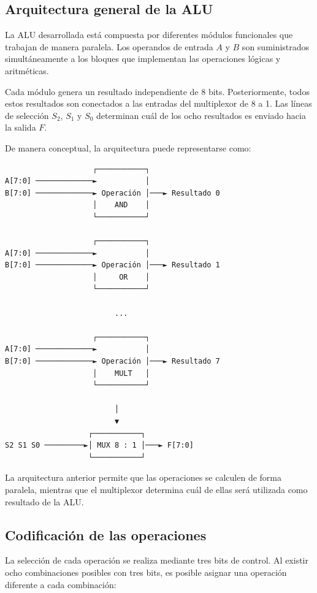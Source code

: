\documentclass[12pt,a4paper]{article}
\begin{document}
\subsection{Arquitectura general de la ALU}

La ALU desarrollada está compuesta por diferentes módulos funcionales que trabajan de manera paralela. Los operandos de entrada $A$ y $B$ son suministrados simultáneamente a los bloques que implementan las operaciones lógicas y aritméticas.

Cada módulo genera un resultado independiente de 8 bits. Posteriormente, todos estos resultados son conectados a las entradas del multiplexor de 8 a 1. Las líneas de selección $S_2$, $S_1$ y $S_0$ determinan cuál de los ocho resultados es enviado hacia la salida $F$.

De manera conceptual, la arquitectura puede representarse como:

\begin{verbatim}
                    ┌───────────┐
A[7:0] ─────────────►           │
B[7:0] ─────────────► Operación │───► Resultado 0
                    │    AND    │
                    └───────────┘

                    ┌───────────┐
A[7:0] ─────────────►           │
B[7:0] ─────────────► Operación │───► Resultado 1
                    │     OR    │
                    └───────────┘

                         ...
                         
                    ┌───────────┐
A[7:0] ─────────────►           │
B[7:0] ─────────────► Operación │───► Resultado 7
                    │    MULT   │
                    └───────────┘
                             
                         │
                         ▼
                   ┌───────────┐
S2 S1 S0 ─────────►│ MUX 8 : 1 │───► F[7:0]
                   └───────────┘
\end{verbatim}

La arquitectura anterior permite que las operaciones se calculen de forma paralela, mientras que el multiplexor determina cuál de ellas será utilizada como resultado de la ALU.

\subsection{Codificación de las operaciones}

La selección de cada operación se realiza mediante tres bits de control. Al existir ocho combinaciones posibles con tres bits, es posible asignar una operación diferente a cada combinación:
\end{document}
